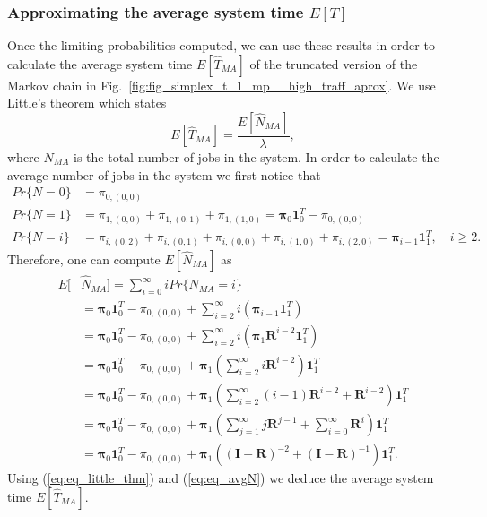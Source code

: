\documentclass[sigconf,draft]{acmart}
\begin{document}
\subsubsection{Approximating the average system time $E[T]$}
Once the limiting probabilities computed, we can use these results in order to calculate the average system time $E[\hat{T}_{MA}]$ of the truncated version of the Markov chain in Fig.~\ref{fig:fig_simplex_t_1_mp__high_traff_aprox}. We use Little's theorem which states
\begin{equation}
\label{eq:eq_little_thm}
  E[\hat{T}_{MA}] = \frac{E[\hat{N}_{MA}]}{\lambda},
\end{equation}
where $N_{MA}$ is the total number of jobs in the system. In order to calculate the average number of jobs in the system we first notice that
\begin{equation*}
  \begin{split}
    Pr\{N=0\} &= \pi_{0,(0,0)} \\
	Pr\{N=1\} &= \pi_{1,(0,0)} + \pi_{1,(0,1)} + \pi_{1,(1,0)} = \bm{\pi}_0\bm{1}_0^T-\pi_{0,(0,0)} \\
	Pr\{N=i\} &= \pi_{i,(0,2)} + \pi_{i,(0,1)} + \pi_{i,(0,0)}+ \pi_{i,(1,0)} + \pi_{i,(2,0)} = \bm{\pi}_{i-1}\bm{1}_1^T, \quad i \geq 2.
  \end{split}
\end{equation*}
Therefore, one can compute $E[\hat{N}_{MA}]$ as
\begin{equation}
  \begin{split}
  E[&\hat{N}_{MA}] = \sum_{i=0}^{\infty} i Pr\{N_{MA}=i\} \\
    &= \bm{\pi}_0\bm{1}_0^T-\pi_{0,(0,0)} + \sum_{i=2}^{\infty} i(\bm{\pi}_{i-1}\bm{1}_1^T) \\
    &= \bm{\pi}_0\bm{1}_0^T-\pi_{0,(0,0)} + \sum_{i=2}^{\infty} i(\bm{\pi}_1\bm{R}^{i-2}\bm{1}_1^T) \\
    &= \bm{\pi}_0\bm{1}_0^T-\pi_{0,(0,0)} + \bm{\pi}_1 (\sum_{i=2}^{\infty} i \bm{R}^{i-2})\bm{1}_1^T \\
    &= \bm{\pi}_0\bm{1}_0^T-\pi_{0,(0,0)} + \bm{\pi}_1 (\sum_{i=2}^{\infty} (i-1)\bm{R}^{i-2} + \bm{R}^{i-2})\bm{1}_1^T \\
    &= \bm{\pi}_0\bm{1}_0^T-\pi_{0,(0,0)} + \bm{\pi}_1 (\sum_{j=1}^{\infty} j\bm{R}^{j-1} + \sum_{i=0}^{\infty} \bm{R}^i)\bm{1}_1^T \\
    &= \bm{\pi}_0\bm{1}_0^T-\pi_{0,(0,0)} + \bm{\pi}_1 ((\bm{I}-\bm{R})^{-2} + (\bm{I}-\bm{R})^{-1})\bm{1}_1^T.
  \end{split}
  \label{eq:eq_avgN}
\end{equation}
Using (\ref{eq:eq_little_thm}) and (\ref{eq:eq_avgN}) we deduce the average system time $E[\hat{T}_{MA}]$.
\end{document}
